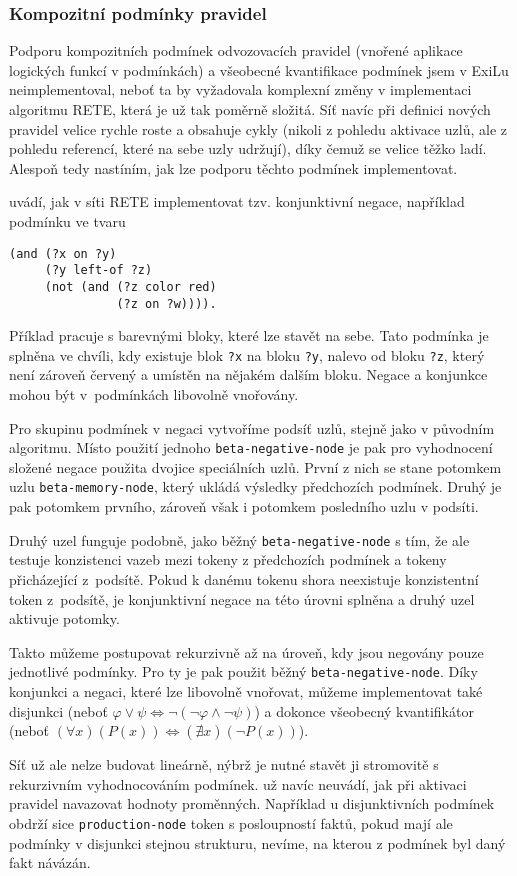 \subsubsection{Kompozitní podmínky pravidel}
\label{composite conditions}

Podporu kompozitních podmínek odvozovacích pravidel (vnořené aplikace logických
funkcí v podmínkách) a všeobecné kvantifikace podmínek jsem v ExiLu
neimplementoval, neboť ta by vyžadovala komplexní změny v implementaci algoritmu
RETE, která je už tak poměrně složitá. Síť navíc při definici nových pravidel
velice rychle roste a obsahuje cykly (nikoli z pohledu aktivace uzlů, ale z
pohledu referencí, které na sebe uzly udržují), díky čemuž se velice těžko ladí.
Alespoň tedy nastíním, jak lze podporu těchto podmínek implementovat.

\cite{doorenbos} uvádí, jak v síti RETE implementovat tzv. konjunktivní negace,
například podmínku ve tvaru
\begin{verbatim}
(and (?x on ?y)
     (?y left-of ?z)
     (not (and (?z color red)
               (?z on ?w)))).
\end{verbatim}
Příklad pracuje s barevnými bloky, které lze stavět na sebe. Tato podmínka je
splněna ve chvíli, kdy existuje blok \verb|?x| na bloku \verb|?y|, nalevo od
bloku \verb|?z|, který není zároveň červený a umístěn na nějakém dalším bloku.
Negace a konjunkce mohou být v~podmínkách libovolně vnořovány.

Pro skupinu podmínek v negaci vytvoříme podsíť uzlů, stejně jako v původním
algoritmu. Místo použití jednoho \verb|beta-negative-node| je pak pro
vyhodnocení složené negace použita dvojice speciálních uzlů. První z nich se
stane potomkem uzlu \verb|beta-memory-node|, který ukládá výsledky předchozích
podmínek. Druhý je pak potomkem prvního, zároveň však i potomkem posledního uzlu
v podsíti.

Druhý uzel funguje podobně, jako běžný \verb|beta-negative-node|
s tím, že ale testuje konzistenci vazeb mezi tokeny z předchozích podmínek a
tokeny přicházející z~podsítě. Pokud k danému tokenu shora neexistuje
konzistentní token z~podsítě, je konjunktivní negace na této úrovni splněna a
druhý uzel aktivuje potomky.

Takto můžeme postupovat rekurzivně až na úroveň, kdy jsou negovány pouze
jednotlivé podmínky. Pro ty je pak použit běžný \verb|beta-negative-node|. Díky
konjunkci a negaci, které lze libovolně vnořovat, můžeme implementovat také
disjunkci (neboť
$\varphi \lor \psi \Leftrightarrow \lnot(\lnot \varphi \land \lnot \psi)$)
a dokonce všeobecný kvantifikátor
(neboť $(\forall x)(P(x)) \Leftrightarrow (\nexists x)(\lnot P(x))$).

Síť už ale nelze budovat lineárně, nýbrž je nutné stavět ji stromovitě s
rekurzivním vyhodnocováním podmínek. \cite{doorenbos} už navíc neuvádí, jak při
aktivaci pravidel navazovat hodnoty proměnných. Například u disjunktivních
podmínek obdrží sice \verb|production-node| token s posloupností faktů, pokud
mají ale podmínky v disjunkci stejnou strukturu, nevíme, na kterou z podmínek
byl daný fakt návázán.
